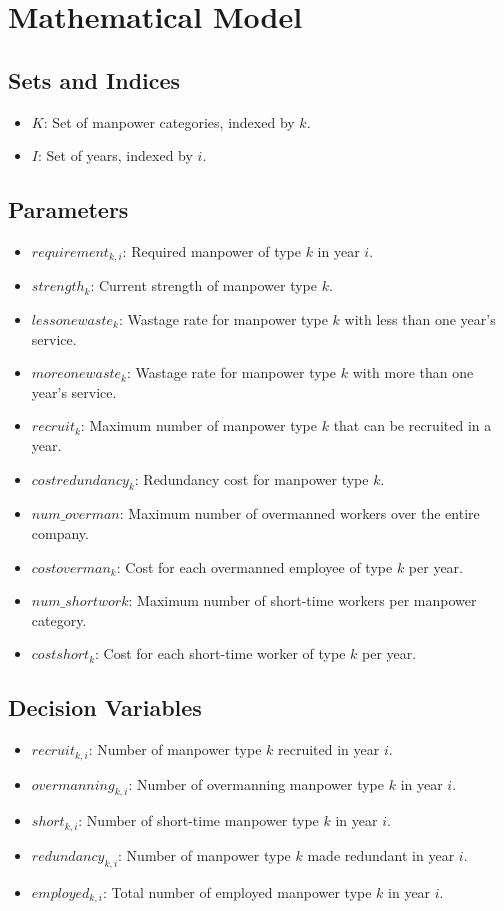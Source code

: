 \documentclass{article}
\begin{document}
\section*{Mathematical Model}

\subsection*{Sets and Indices}
\begin{itemize}
    \item $K$: Set of manpower categories, indexed by $k$.
    \item $I$: Set of years, indexed by $i$.
\end{itemize}

\subsection*{Parameters}
\begin{itemize}
    \item $requirement_{k,i}$: Required manpower of type $k$ in year $i$.
    \item $strength_k$: Current strength of manpower type $k$.
    \item $lessonewaste_k$: Wastage rate for manpower type $k$ with less than one year's service.
    \item $moreonewaste_k$: Wastage rate for manpower type $k$ with more than one year's service.
    \item $recruit_k$: Maximum number of manpower type $k$ that can be recruited in a year.
    \item $costredundancy_k$: Redundancy cost for manpower type $k$.
    \item $num\_overman$: Maximum number of overmanned workers over the entire company.
    \item $costoverman_k$: Cost for each overmanned employee of type $k$ per year.
    \item $num\_shortwork$: Maximum number of short-time workers per manpower category.
    \item $costshort_k$: Cost for each short-time worker of type $k$ per year.
\end{itemize}

\subsection*{Decision Variables}
\begin{itemize}
    \item $recruit_{k,i}$: Number of manpower type $k$ recruited in year $i$.
    \item $overmanning_{k,i}$: Number of overmanning manpower type $k$ in year $i$.
    \item $short_{k,i}$: Number of short-time manpower type $k$ in year $i$.
    \item $redundancy_{k,i}$: Number of manpower type $k$ made redundant in year $i$.
    \item $employed_{k,i}$: Total number of employed manpower type $k$ in year $i$.
\end{itemize}
\end{document}
